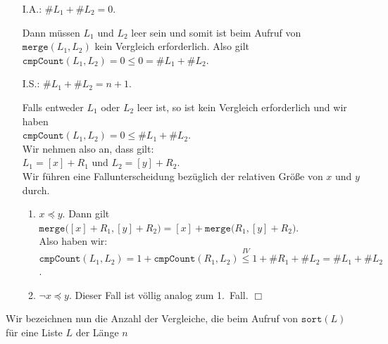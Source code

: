 \begin{enumerate}
\item[I.A.:] $\#L_1 + \#L_2=0$.

             Dann m\"ussen $L_1$ und $L_2$ leer sein und somit ist beim Aufruf
             von $\mathtt{merge}(L_1, L_2)$ kein Vergleich erforderlich.  Also gilt \\[0.1cm]
             \hspace*{1.3cm} $\mathtt{cmpCount}(L_1, L_2) = 0 \leq 0 = \#L_1 + \#L_2$.
\item[I.S.:] $\#L_1 + \#L_2 = n+1$.

             Falls entweder $L_1$ oder $L_2$ leer ist, so ist kein Vergleich erforderlich
             und wir haben 
             \\[0.1cm]
             \hspace*{1.3cm}
             $\mathtt{cmpCount}(L_1,L_2) = 0 \leq \#L_1 + \#L_2$.
             \\[0.1cm]
             Wir nehmen also an, dass gilt: \\[0.1cm]
             \hspace*{1.3cm} $L_1 = [x] + R_1$ \quad und \quad $L_2 = [y] + R_2$.
             \\[0.1cm]
             Wir f\"uhren eine Fallunterscheidung bez\"uglich der relativen Gr\"o\ss{}e von $x$ und $y$ 
             durch.
             \begin{enumerate}
             \item $x \preceq y$.  Dann gilt \\[0.1cm]
                   \hspace*{1.3cm} 
                   $\mathtt{merge}\bigl([x] + R_1, [y] + R_2\bigr) = [x] +
                   \mathtt{merge}\bigl(R_1, [y] + R_2\bigr)$. \\[0.1cm]
                   Also haben wir: \\[0.1cm]
                   \hspace*{1.3cm} 
                   $\mathtt{cmpCount}(L_1, L_2) = 1 + \mathtt{cmpCount}(R_1, L_2) \stackrel{IV}{\leq} 1 + \#R_1 + \#L_2 = \#L_1 + \#L_2$.
             \item $\neg x \preceq y$.  Dieser Fall ist v\"ollig analog zum 1.~Fall. \hspace*{\fill} $\Box$
             \end{enumerate}
\end{enumerate}
Wir bezeichnen nun die Anzahl der Vergleiche, die beim Aufruf von
$\mathtt{sort}(L)$ f\"ur eine Liste $L$ der L\"ange $n$
